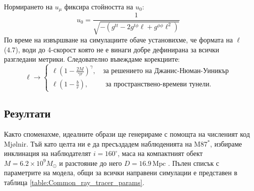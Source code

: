 \documentclass[12pt]{article}
\numberwithin{equation}{section}
\numberwithin{figure}{section}
\begin{document}
	Нормирането на $u_\mu$ фиксира стойността на $u_0$:
	\begin{equation}
		u_0 = \frac{1}{\sqrt{-(g^{tt} - 2g^{t\phi}\ell + g^{\phi\phi}\ell^2)}}
	\end{equation}
	По време на извършване на симулациите обаче установихме, че формата на $\ell$ (4.7), води до 4-скорост която не е винаги добре дефинирана за всички разгледани метрики. Следователно въвеждаме корекциите:
	\begin{equation}
		\ell\rightarrow\begin{cases}
			\ell \left(1 - \frac{2M}{\gamma r}\right)^{\gamma}, \quad\text{за решението на Джанис-Нюман-Уиникър}\\
			\ell \left(1 - \frac{b}{r}\right), \,\,\,\qquad\text{за пространствено-времеви тунели}.
		\end{cases}
	\end{equation}
	
	\subsection{Резултати}
	
	Както споменахме, идеалните образи ще генерираме с помощта на численият код Mjølnir. Тъй като целта ни е да пресъздадем наблюденията на M87$^*$, избираме инклинация на наблюдателят $i = 160^\circ$, маса на компактният обект $M = 6.2\times 10^9M_\odot$ и разстояние до него $D = 16.9\, \text{Mpc}$ \cite{EHT_M87_I}. Пълен списък с параметрите на модела, общи за всички направени симулации е представен в таблица \ref{table:Common_ray_tracer_params}.\\
	
\end{document}
